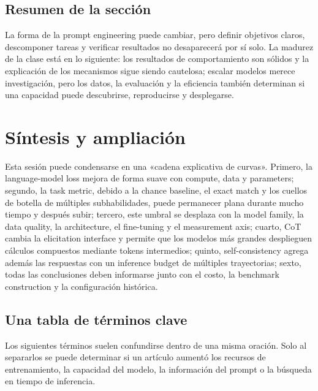 \documentclass[a4paper]{article}
\begin{document}

\subsection{Resumen de la sección}

La forma de la prompt engineering puede cambiar, pero definir objetivos claros, descomponer tareas y verificar resultados no desaparecerá por sí solo. La madurez de la clase está en lo siguiente: los resultados de comportamiento son sólidos y la explicación de los mecanismos sigue siendo cautelosa; escalar modelos merece investigación, pero los datos, la evaluación y la eficiencia también determinan si una capacidad puede descubrirse, reproducirse y desplegarse.
\section{Síntesis y ampliación}

Esta sesión puede condensarse en una «cadena explicativa de curvas». Primero, la language-model loss mejora de forma suave con compute, data y parameters; segundo, la task metric, debido a la chance baseline, el exact match y los cuellos de botella de múltiples subhabilidades, puede permanecer plana durante mucho tiempo y después subir; tercero, este umbral se desplaza con la model family, la data quality, la architecture, el fine-tuning y el measurement axis; cuarto, CoT cambia la elicitation interface y permite que los modelos más grandes desplieguen cálculos compuestos mediante tokens intermedios; quinto, self-consistency agrega además las respuestas con un inference budget de múltiples trayectorias; sexto, todas las conclusiones deben informarse junto con el costo, la benchmark construction y la configuración histórica.

\subsection{Una tabla de términos clave}

Los siguientes términos suelen confundirse dentro de una misma oración. Solo al separarlos se puede determinar si un artículo aumentó los recursos de entrenamiento, la capacidad del modelo, la información del prompt o la búsqueda en tiempo de inferencia.
\end{document}
